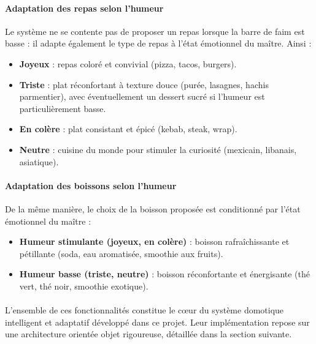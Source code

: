 \paragraph{Adaptation des repas selon l'humeur} Le système ne se contente pas de 
proposer un repas lorsque la barre de faim est basse : il adapte également le type 
de repas à l'état émotionnel du maître. Ainsi :
\begin{itemize}
    \item \textbf{Joyeux} : repas coloré et convivial (pizza, tacos, burgers).
    \item \textbf{Triste} : plat réconfortant à texture douce (purée, lasagnes, 
    hachis parmentier), avec éventuellement un dessert sucré si l'humeur est 
    particulièrement basse.
    \item \textbf{En colère} : plat consistant et épicé (kebab, steak, wrap).
    \item \textbf{Neutre} : cuisine du monde pour stimuler la curiosité 
    (mexicain, libanais, asiatique).
\end{itemize}

\paragraph{Adaptation des boissons selon l'humeur} De la même manière, le choix de 
la boisson proposée est conditionné par l'état émotionnel du maître :
\begin{itemize}
    \item \textbf{Humeur stimulante (joyeux, en colère)} : boisson rafraîchissante 
    et pétillante (soda, eau aromatisée, smoothie aux fruits).
    \item \textbf{Humeur basse (triste, neutre)} : boisson réconfortante et 
    énergisante (thé vert, thé noir, smoothie exotique).
\end{itemize}

\paragraph{} L'ensemble de ces fonctionnalités constitue le cœur du système domotique 
intelligent et adaptatif développé dans ce projet. Leur implémentation repose sur 
une architecture orientée objet rigoureuse, détaillée dans la section suivante.